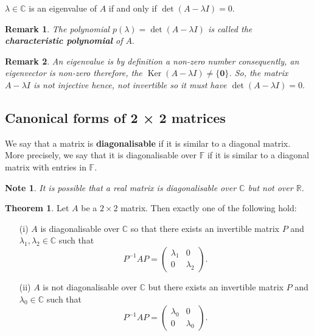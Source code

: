 \documentclass[12pt, a4paper]{article}
\newtheorem*{remark}{Remark}
\newtheorem*{note}{Note}
\theoremstyle{definition}
\newtheorem{theorem}{Theorem}[section]
\theoremstyle{plain}
\newcommand{\bb}[1]{\mathbb{#1}}
\newcommand{\vect}[1]{\mathbf{#1}}
\DeclareMathOperator{\Ker}{Ker}
\begin{document}
\begin{tcolorbox}
$\lambda \in \bb{C}$ is an eigenvalue of $A$ if and only if $\det{(A-\lambda I)}=0.$
\end{tcolorbox}

\begin{remark}
The polynomial $p(\lambda) = \det{(A - \lambda I)}$ is called the \textbf{characteristic polynomial} of $A.$
\end{remark}

\begin{remark}
An eigenvalue is by definition a non-zero number consequently, an eigenvector is non-zero therefore, the $\Ker{(A-\lambda I)} \neq \{\vect{0}\}$. So, the matrix $A-\lambda I$ is not injective hence, not invertible so it must have $\det{(A-\lambda I) =0}.$
\end{remark}

\subsection{Canonical forms of 2 × 2 matrices}

We say that a matrix is \textbf{diagonalisable} if it is similar to a diagonal matrix. More precisely, we say that it is diagonalisable over $\bb{F}$ if it is similar to a diagonal matrix with entries in $\bb{F}.$ 

\begin{note}
It is possible that a real matrix is diagonalisable over $\bb{C}$ but not over $\bb{R}.$
\end{note}

\begin{theorem} Let $A$ be a $2 \times 2$ matrix. Then exactly one of the following hold: 
\begin{enumerate}
	
	\item[(i)] $A$ is diagonalisable over $\bb{C}$ so that there exists an invertible matrix $P$ and $\lambda_1, \lambda_2 \in \bb{C}$ such that $$P^{-1}AP=\begin{pmatrix} \lambda_1 & 0 \\ 0 & \lambda_2 \end{pmatrix}.$$

	\item[(ii)] $A$ is not diagonalisable over $\bb{C}$ but there exists an invertible matrix $P$ and $\lambda_0 \in \bb{C}$ such that $$P^{-1}AP=\begin{pmatrix} \lambda_0 & 0 \\ 0 & \lambda_0 \end{pmatrix}.$$

\end{enumerate}
\end{theorem}
\end{document}

